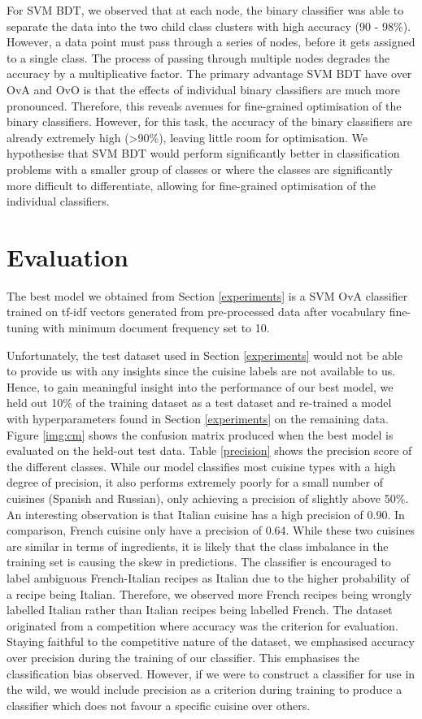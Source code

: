 \documentclass{article}
\begin{document}
For SVM BDT, we observed that at each node, the binary classifier was able to separate the data into the two child class clusters with high accuracy (90 - 98\%). However, a data point must pass through a series of nodes, before it gets assigned to a single class. The process of passing through multiple nodes degrades the accuracy by a multiplicative factor. The primary advantage SVM BDT have over OvA and OvO is that the effects of individual binary classifiers are much more pronounced. Therefore, this reveals avenues for fine-grained optimisation of the binary classifiers. However, for this task, the accuracy of the binary classifiers are already extremely high (\textgreater{90\%}), leaving little room for optimisation. We hypothesise that SVM BDT would perform significantly better in classification problems with a smaller group of classes or where the classes are significantly more difficult to differentiate, allowing for fine-grained optimisation of the individual classifiers.

\section{Evaluation}
The best model we obtained from Section \ref{experiments} is a SVM OvA classifier trained on tf-idf vectors generated from pre-processed data after vocabulary fine-tuning with minimum document frequency set to 10.

Unfortunately, the test dataset used in Section \ref{experiments} would not be able to provide us with any insights since the cuisine labels are not available to us. Hence, to gain meaningful insight into the performance of our best model, we held out 10\% of the training dataset as a test dataset and re-trained a model with hyperparameters found in Section \ref{experiments} on the remaining data. Figure \ref{img:cm} shows the confusion matrix produced when the best model is evaluated on the held-out test data. Table \ref{precision} shows the precision score of the different classes. While our model classifies most cuisine types with a high degree of precision, it also performs extremely poorly for a small number of cuisines (Spanish and Russian), only achieving a precision of slightly above 50\%. An interesting observation is that Italian cuisine has a high precision of 0.90. In comparison, French cuisine only have a precision of 0.64. While these two cuisines are similar in terms of ingredients, it is likely that the class imbalance in the training set is causing the skew in predictions. The classifier is encouraged to label ambiguous French-Italian recipes as Italian due to the higher probability of a recipe being Italian. Therefore, we observed more French recipes being wrongly labelled Italian rather than Italian recipes being labelled French. 
The dataset originated from a competition where accuracy was the criterion for evaluation. Staying faithful to the competitive nature of the dataset, we emphasised accuracy over precision during the training of our classifier. This emphasises the classification bias observed. However, if we were to construct a classifier for use in the wild, we would include precision as a criterion during training to produce a classifier which does not favour a specific cuisine over others.
\end{document}
